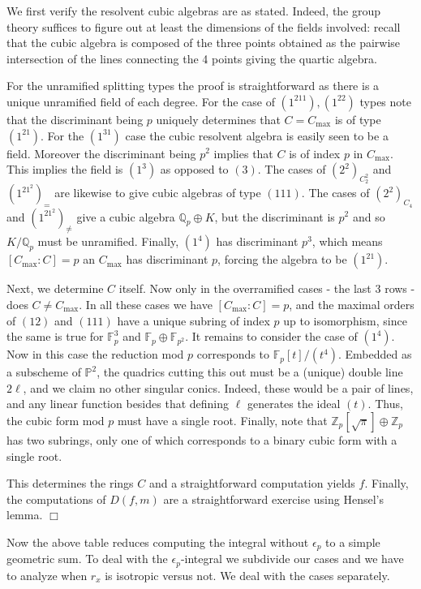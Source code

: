 \documentclass{article}
\def\Z{{\mathbb Z}}
\def\P{{\mathbb P}}
\def\F{{\mathbb F}}
\def\Q{{\mathbb Q}}
\def\Z{{\mathbb Z}}
\def\P{{\mathbb P}}
\def\F{{\mathbb F}}
\def\Q{{\mathbb Q}}
\newenvironment{proof}{\noindent {\bf Proof:}}{$\Box$ \vspace{2 ex}}
\begin{document}
\begin{proof}
We first verify the resolvent cubic algebras are as stated. Indeed, the group theory suffices to figure out at least the dimensions of the fields involved: recall that the cubic algebra is composed of the three points obtained as the pairwise intersection of the lines connecting the 4 points giving the quartic algebra.

For the unramified splitting types the proof is straightforward as there is a unique unramified field of each degree.
For the case of $(1^211),(1^22)$ types note that the discriminant being $p$ uniquely determines that $C=C_{\max}$ is of type $(1^21)$. For the $(1^31)$ case the cubic resolvent algebra is easily seen to be a field. Moreover the discriminant being $p^2$ implies that $C$ is of index $p$ in $C_{\max}$. This implies the field is $(1^3)$ as opposed to $(3)$. 
The cases of $(2^2)_{C_2^2}$ and $(1^21^2)_{=}$ are likewise to give cubic algebras of type $(111)$. The cases of  $(2^2)_{C_4}$ and $(1^21^2)_{\neq}$ give a cubic algebra $\Q_p\oplus K$, but the discriminant is $p^2$ and so $K/\Q_p$ must be unramified. 
Finally, $(1^4)$ has discriminant $p^3$, which means $[C_{\max}:C]=p$ an $C_{\max}$ has discriminant $p$, forcing the algebra to be $(1^21)$.
\vspace{0.1in}

Next, we determine $C$ itself. Now only in the overramified cases - the last 3 rows - does $C\neq C_{\max}$. In all these cases we have $[C_{\max}:C]=p$, and the maximal orders of $(12)$ and $(111)$ have a unique subring of index $p$ up to isomorphism, since the same is true for $\F_p^3$ and $\F_p\oplus\F_{p^2}$. 
It remains to consider the case of $(1^4)$. Now in this case the reduction mod $p$ corresponds to $\F_p[t]/(t^4)$. Embedded as a subscheme of $\P^2$, the quadrics cutting this out must be a (unique) double line $2\ell$, and we claim no other singular conics. Indeed, these would be a pair of lines, and any linear function besides that defining $\ell$ generates the ideal $(t)$. 
Thus, the cubic form mod $p$ must have a single root. 
Finally, note that $\Z_p[\sqrt{\pi}]\oplus \Z_p$ has two subrings, only one of which corresponds to a binary cubic form with a single root.  

This determines the rings $C$ and a straightforward computation yields $f$. Finally, the computations of $D(f,m)$ are a straightforward  exercise using Hensel's lemma. 
\end{proof}


Now the above table reduces computing the integral without $\epsilon_p$ to a simple geometric sum. To deal with the $\epsilon_p$-integral we subdivide our cases and we have to analyze when $r_x$ is isotropic versus not. We deal with the cases separately.
\end{document}
